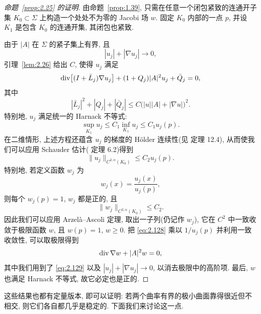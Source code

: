 \begin{proof}[命题~\ref{prop:2.25} 的证明]
由命题~\ref{prop:1.39}, 只需在任意一个闭包紧致的连通开子集 $K_0\subset\Sigma$
上构造一个处处不为零的 Jacobi 场 $w$. 固定 $K_0$ 内部的一点 $p$, 并设 $K_1$
是包含 $K_0$ 的连通开集, 其闭包也紧致.

由于 $|A|$ 在 $\Sigma$ 的紧子集上有界, 且
\begin{equation}
|u_j|+|\nabla u_j|\to0,
\label{eq:2.127}
\end{equation}
引理~\ref{lem:2.26} 给出 $C$, 使得 $u_j$ 满足
\begin{equation}
\operatorname{div}\bigl[(I+\bar L_j)\nabla u_j\bigr]
 +(1+Q_j)|A|^{2}u_j+\bar Q_j=0,
\label{eq:2.128}
\end{equation}
其中
\begin{equation}
|\bar L_j|^{2}+|Q_j|+|\bar Q_j|
 \leq C\bigl(|u||A|+|\nabla u|\bigr)^{2}.
\label{eq:2.129}
\end{equation}
特别地, $u_j$ 满足统一的 Harnack 不等式:
\begin{equation}
\sup_{K_1}u_j\leq C_1\inf_{K_1}u_j\leq C_1u_j(p).
\label{eq:2.130}
\end{equation}
在二维情形, 上述方程还蕴含 $u_j$ 的梯度的 Hölder 连续性(见 \cite{GiTr} 定理
12.4), 从而使我们可以应用 Schauder 估计(\cite{GiTr} 定理 6.2)得到
\begin{equation}
\|u_j\|_{C^{2,\alpha}(K_0)}\leq C_2u_j(p).
\label{eq:2.131}
\end{equation}
特别地, 若定义函数 $w_j$ 为
\begin{equation}
w_j(x)=\frac{u_j(x)}{u_j(p)},
\label{eq:2.132}
\end{equation}
则每个 $w_j(p)=1$, $w_j$ 都是正的, 且
\begin{equation}
\|w_j\|_{C^{2,\alpha}(K_0)}\leq C_2.
\label{eq:2.133}
\end{equation}
因此我们可以应用 Arzelà--Ascoli 定理, 取出一子列(仍记作 $w_j$), 它在 $C^{2}$
中一致收敛于极限函数 $w$, 且 $w(p)=1$, $w\geq0$. 把 \eqref{eq:2.128} 乘以 $1/u_j(p)$
并利用一致收敛性, 可以取极限得到
\begin{equation}
\operatorname{div}\nabla w+|A|^{2}w=0,
\label{eq:2.134}
\end{equation}
其中我们用到了 \eqref{eq:2.129} 以及 $|u_j|+|\nabla u_j|\to0$, 以消去极限中的高阶项.
最后, $w$ 也满足 Harnack 不等式, 故它必定也是正的.
\end{proof}

这些结果也都有定量版本, 即可以证明: 若两个曲率有界的极小曲面靠得很近但不相交,
则它们各自都几乎是稳定的. 下面我们来讨论这一点.

